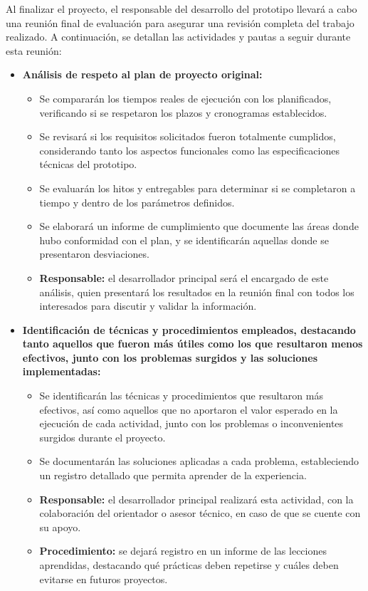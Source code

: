 \documentclass[
11pt, %
]{charter}
\begin{document}


Al finalizar el proyecto, el responsable del desarrollo del prototipo llevará a cabo una reunión final de evaluación para asegurar una revisión completa del trabajo realizado. A continuación, se detallan las actividades y pautas a seguir durante esta reunión:

\begin{itemize}
    \item \textbf{Análisis de respeto al plan de proyecto original:}
    \begin{itemize}
        \item Se compararán los tiempos reales de ejecución con los planificados, verificando si se respetaron los plazos y cronogramas establecidos.
        \item Se revisará si los requisitos solicitados fueron totalmente cumplidos, considerando tanto los aspectos funcionales como las especificaciones técnicas del prototipo.
        \item Se evaluarán los hitos y entregables para determinar si se completaron a tiempo y dentro de los parámetros definidos.
        \item Se elaborará un informe de cumplimiento que documente las áreas donde hubo conformidad con el plan, y se identificarán aquellas donde se presentaron desviaciones.
        \item \textbf{Responsable:} el desarrollador principal será el encargado de este análisis, quien presentará los resultados en la reunión final con todos los interesados para discutir y validar la información.
    \end{itemize}
    
    \item \textbf{Identificación de técnicas y procedimientos empleados, destacando tanto aquellos que fueron más útiles como los que resultaron menos efectivos, junto con los problemas surgidos y las soluciones implementadas:}
    \begin{itemize}
        \item Se identificarán las técnicas y procedimientos que resultaron más efectivos, así como aquellos que no aportaron el valor esperado en la ejecución de cada actividad, junto con los problemas o inconvenientes surgidos durante el proyecto.
        \item Se documentarán las soluciones aplicadas a cada problema, estableciendo un registro detallado que permita aprender de la experiencia.
        \item \textbf{Responsable:} el desarrollador principal realizará esta actividad, con la colaboración del orientador o asesor técnico, en caso de que se cuente con su apoyo.
        \item \textbf{Procedimiento:} se dejará registro en un informe de las lecciones aprendidas, destacando qué prácticas deben repetirse y cuáles deben evitarse en futuros proyectos.
    \end{itemize}
    

\end{itemize}
\end{document}
